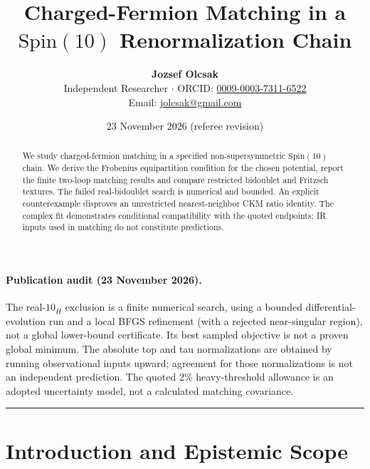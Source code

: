 \documentclass[11pt,a4paper]{article}
\title{Charged-Fermion Matching in a \texorpdfstring{$\mathrm{Spin}(10)$}{Spin(10)} Renormalization Chain}
\author{\textbf{Jozsef Olcsak}\\
\small Independent Researcher $\cdot$ ORCID: \href{https://orcid.org/0009-0003-7311-6522}{0009-0003-7311-6522}\\
\small Email: \href{mailto:jolcsak@gmail.com}{jolcsak@gmail.com}}
\date{23 November 2026 (referee revision)}
\begin{document}
\maketitle

\begin{abstract}
\noindent We study charged-fermion matching in a specified non-supersymmetric $\mathrm{Spin}(10)$ chain. We derive the Frobenius equipartition condition for the chosen potential, report the finite two-loop matching results and compare restricted bidoublet and Fritzsch textures. The failed real-bidoublet search is numerical and bounded. An explicit counterexample disproves an unrestricted nearest-neighbor CKM ratio identity. The complex fit demonstrates conditional compatibility with the quoted endpoints; IR inputs used in matching do not constitute predictions.
\end{abstract}

\paragraph{Publication audit (23 November 2026).}
The real-$10_H$ exclusion is a finite numerical search, using a bounded
differential-evolution run and a local BFGS refinement (with a rejected
near-singular region), not a global lower-bound certificate. Its best
sampled objective is not a proven global minimum. The absolute top and
tau normalizations are obtained by running observational inputs upward;
agreement for those normalizations is not an independent prediction.
The quoted $2\%$ heavy-threshold allowance is an adopted uncertainty
model, not a calculated matching covariance.


\tableofcontents
\vspace{0.4em}
\hrule
\vspace{0.8em}

\section{Introduction and Epistemic Scope}
\label{sec:intro}
\end{document}
